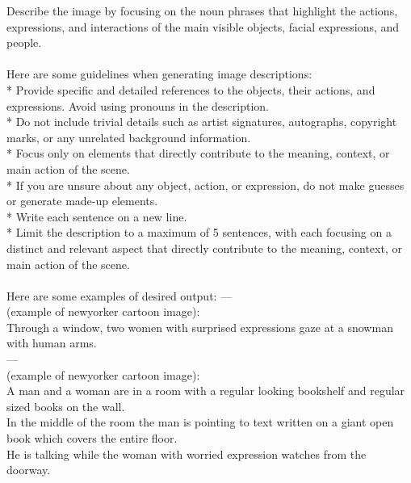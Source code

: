 \begin{figure*}[h]
\small
\begin{tcolorbox}[
    title=Prompt for Image Descriptions,
    colback=white,
    colframe=CadetBlue,
    arc=0pt,        %
    outer arc=0pt   %
]

Describe the image by focusing on the noun phrases that highlight the actions, expressions, and interactions of the main visible objects, facial expressions, and people.\\
\\
Here are some guidelines when generating image descriptions:\\
* Provide specific and detailed references to the objects, their actions, and expressions. Avoid using pronouns in the description.\\
* Do not include trivial details such as artist signatures, autographs, copyright marks, or any unrelated background information.\\
* Focus only on elements that directly contribute to the meaning, context, or main action of the scene.\\
* If you are unsure about any object, action, or expression, do not make guesses or generate made-up elements.\\
* Write each sentence on a new line.\\
* Limit the description to a maximum of 5 sentences, with each focusing on a distinct and relevant aspect that directly contribute to the meaning, context, or main action of the scene.\\
\\
Here are some examples of desired output:
---\\
\text{[Description]} (example of newyorker cartoon image):\\
Through a window, two women with surprised expressions gaze at a snowman with human arms.\\
---\\
\text{[Description]} (example of newyorker cartoon image):\\
A man and a woman are in a room with a regular looking bookshelf and regular sized books on the wall.\\
In the middle of the room the man is pointing to text written on a giant open book which covers the entire floor.\\
He is talking while the woman with worried expression watches from the doorway.\\

\end{tcolorbox}
\end{figure*}
